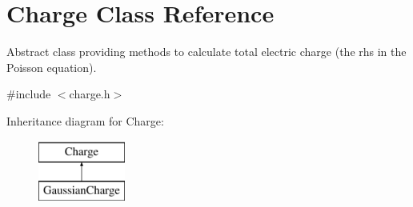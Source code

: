 \hypertarget{classCharge}{\section{Charge Class Reference}
\label{classCharge}
}


Abstract class providing methods to calculate total electric charge (the rhs in the Poisson equation).  




{\ttfamily \#include $<$charge.\-h$>$}

Inheritance diagram for Charge\-:\begin{figure}[H]
\begin{center}
\leavevmode
\includegraphics[height=2.000000cm]{classCharge}
\end{center}
\end{figure}
